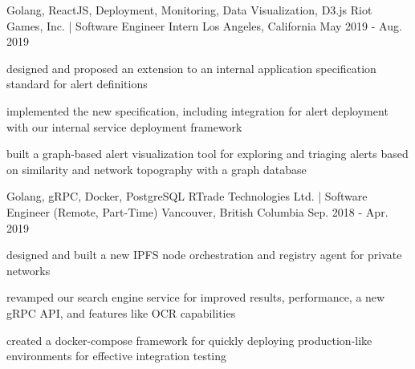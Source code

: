 

\begin{cventries}

  \cventry
    {Golang, ReactJS, Deployment, Monitoring, Data Visualization, D3.js} %
    {Riot Games, Inc. | Software Engineer Intern} %
    {Los Angeles, California} %
    {May 2019 - Aug. 2019} %
    {
      \begin{cvitems} %
        \item {designed and proposed an extension to an internal application specification standard for alert definitions}
        \item{implemented the new specification, including integration for alert deployment with our internal service deployment framework}
        \item {built a graph-based alert visualization tool for exploring and triaging alerts based on similarity and network topography with a graph database}
      \end{cvitems}
    }

  \cventry
    {Golang, gRPC, Docker, PostgreSQL} %
    {RTrade Technologies Ltd. | Software Engineer (Remote, Part-Time)} %
    {Vancouver, British Columbia} %
    {Sep. 2018 - Apr. 2019} %
    {
      \begin{cvitems} %
        \item {designed and built a new IPFS node orchestration and registry agent for private networks}
        \item {revamped our search engine service for improved results, performance, a new gRPC API, and features like OCR capabilities}
        \item {created a docker-compose framework for quickly deploying production-like environments for effective integration testing}
      \end{cvitems}
    }


\end{cventries}
